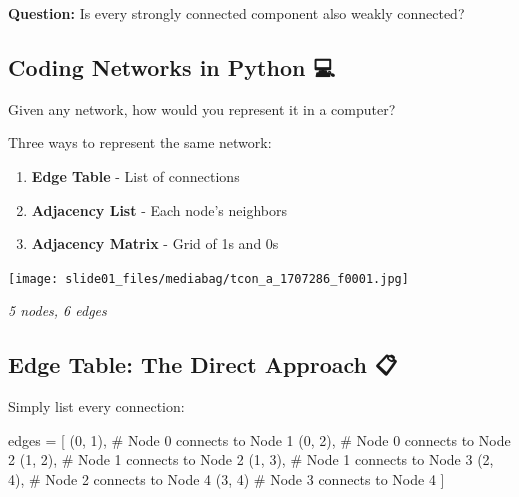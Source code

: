 \documentclass[
  letterpaper,
  DIV=11,
  numbers=noendperiod,
  oneside]{scrartcl}
\newenvironment{Shaded}{}{}
\newcommand{\CommentTok}[1]{\textcolor[rgb]{0.42,0.45,0.49}{#1}}
\newcommand{\DecValTok}[1]{\textcolor[rgb]{0.00,0.36,0.77}{#1}}
\newcommand{\NormalTok}[1]{\textcolor[rgb]{0.14,0.16,0.18}{#1}}
\newcommand{\OperatorTok}[1]{\textcolor[rgb]{0.14,0.16,0.18}{#1}}
\providecommand{\tightlist}{%
  \setlength{\itemsep}{0pt}\setlength{\parskip}{0pt}}
\begin{document}
\textbf{Question:} Is every strongly connected component also weakly
connected?

\subsection{Coding Networks in Python
💻}\label{coding-networks-in-python}

Given any network, how would you represent it in a computer?

Three ways to represent the same network:

\begin{enumerate}
\def\labelenumi{\arabic{enumi}.}
\tightlist
\item
  \textbf{Edge Table} - List of connections
\item
  \textbf{Adjacency List} - Each node's neighbors
\item
  \textbf{Adjacency Matrix} - Grid of 1s and 0s
\end{enumerate}

\begin{center}
\texttt{[image: slide01\_files/mediabag/tcon\_a\_1707286\_f0001.jpg]}
\end{center}

\emph{5 nodes, 6 edges}

\subsection{Edge Table: The Direct Approach
📋}\label{edge-table-the-direct-approach}

Simply list every connection:

\begin{Shaded}
\begin{Highlighting}[]
\NormalTok{edges }\OperatorTok{=}\NormalTok{ [}
\NormalTok{    (}\DecValTok{0}\NormalTok{, }\DecValTok{1}\NormalTok{),  }\CommentTok{\# Node 0 connects to Node 1}
\NormalTok{    (}\DecValTok{0}\NormalTok{, }\DecValTok{2}\NormalTok{),  }\CommentTok{\# Node 0 connects to Node 2}
\NormalTok{    (}\DecValTok{1}\NormalTok{, }\DecValTok{2}\NormalTok{),  }\CommentTok{\# Node 1 connects to Node 2}
\NormalTok{    (}\DecValTok{1}\NormalTok{, }\DecValTok{3}\NormalTok{),  }\CommentTok{\# Node 1 connects to Node 3}
\NormalTok{    (}\DecValTok{2}\NormalTok{, }\DecValTok{4}\NormalTok{),  }\CommentTok{\# Node 2 connects to Node 4}
\NormalTok{    (}\DecValTok{3}\NormalTok{, }\DecValTok{4}\NormalTok{)   }\CommentTok{\# Node 3 connects to Node 4}
\NormalTok{]}
\end{Highlighting}
\end{Shaded}
\end{document}
